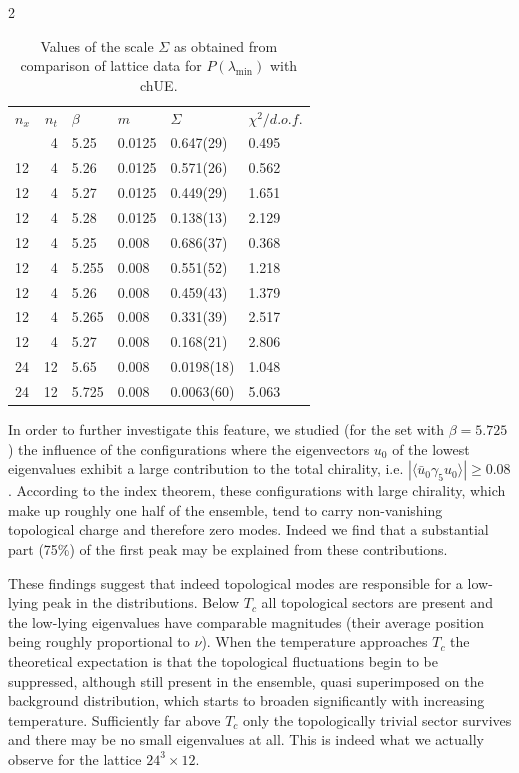 \begin{multicols}{2}
\vspace{15pt}
\begin{table}
\caption{Values of the scale $\Sigma$ as obtained from
comparison of lattice data for $P(\lambda_{\min})$ with chUE.}
\begin{tabular}{lrllll}
$n_x$ &$n_t$& $\beta$ & $m$ & $\Sigma$ & $\chi^2/d.o.f.$ \\
\tableline
12 &  4  & 5.25  & 0.0125 & 0.647(29)  & 0.495 \\
12 &  4  & 5.26  & 0.0125 & 0.571(26)  & 0.562 \\
12 &  4  & 5.27  & 0.0125 & 0.449(29)  & 1.651 \\
12 &  4  & 5.28  & 0.0125 & 0.138(13)  & 2.129 \\
12 &  4  & 5.25  & 0.008  & 0.686(37)  & 0.368 \\
12 &  4  & 5.255 & 0.008  & 0.551(52)  & 1.218 \\
12 &  4  & 5.26  & 0.008  & 0.459(43)  & 1.379 \\
12 &  4  & 5.265 & 0.008  & 0.331(39)  & 2.517 \\
12 &  4  & 5.27  & 0.008  & 0.168(21)  & 2.806 \\
24 & 12  & 5.65  & 0.008  & 0.0198(18) & 1.048 \\
24 & 12  & 5.725 & 0.008  & 0.0063(60) & 5.063 \\
\end{tabular}
\label{tab:fit}
\end{table}

In order to further investigate this feature, we studied (for the set  with
$\beta=5. 725$) the influence of the configurations where the eigenvectors
$u_0$ of the lowest eigenvalues exhibit a large contribution to the total
chirality, i.e. $|\langle \bar{u}_0 \gamma_5 u_0\rangle|\geq 0.08$. According
to the index theorem, these configurations with large chirality, which make up
roughly one half of the ensemble, tend to carry non-vanishing topological
charge and therefore zero modes. Indeed  we find that a substantial part (75\%)
of the first peak may be explained from these contributions.

These findings suggest that indeed topological modes are responsible for a
low-lying peak in the distributions. Below $T_c$ all topological sectors are
present and the low-lying eigenvalues have comparable magnitudes (their average
position being roughly proportional to $\nu$).  When the temperature
approaches  $T_c$ the theoretical expectation is  that the topological
fluctuations begin to be suppressed, although still present in the ensemble,
quasi superimposed on the background distribution,  which starts to broaden
significantly with increasing temperature. Sufficiently far above $T_c$ only
the topologically trivial sector survives and there may be no small eigenvalues
at all. This is indeed what we actually observe for the lattice $24^3\times
12$.


\end{multicols}
